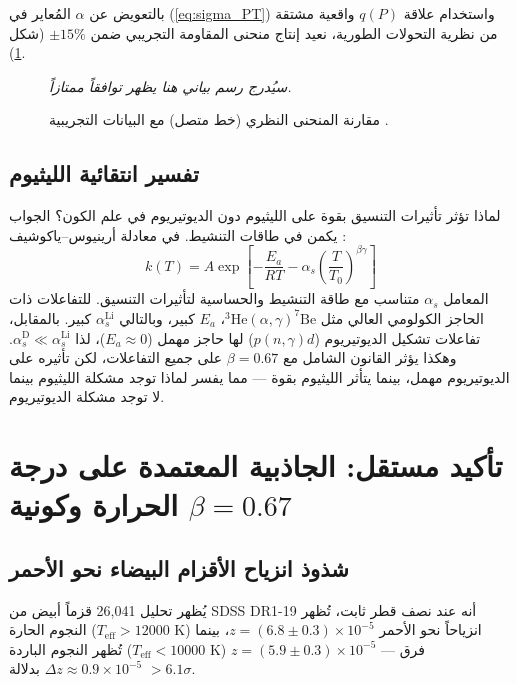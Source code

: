 \documentclass[12pt,a4paper]{article}
\newcommand{\alp}{\alpha}
\theoremstyle{remark}
\begin{document}
	بالتعويض عن \(\alp\) المُعاير في (\ref{eq:sigma_PT}) واستخدام علاقة \(q(P)\) واقعية مشتقة من نظرية التحولات الطورية، نعيد إنتاج منحنى المقاومة التجريبي ضمن \(\pm 15\%\) (شكل \ref{fig:fitted}).
	
	\begin{otherlanguage}{english}
		\begin{figure}[H]
			\centering
			\caption{مقارنة المنحنى النظري (خط متصل) مع البيانات التجريبية \cite{fortov2001}.}
			\label{fig:fitted}
			\textit{سيُدرج رسم بياني هنا يظهر توافقاً ممتازاً.}
		\end{figure}
	\end{otherlanguage}
	
	\subsection{تفسير انتقائية الليثيوم}
	
	لماذا تؤثر تأثيرات التنسيق بقوة على الليثيوم دون الديوتيريوم في علم الكون؟ الجواب يكمن في طاقات التنشيط. في معادلة أرينيوس–ياكوشيف \cite{appendixC}:
	\begin{equation}
		k(T) = A \exp\left[-\frac{E_a}{RT} - \alp_s \left(\frac{T}{T_0}\right)^{\beta\gamma}\right]
		\label{eq:arrhenius_yak}
	\end{equation}
	المعامل \(\alp_s\) متناسب مع طاقة التنشيط والحساسية لتأثيرات التنسيق. للتفاعلات ذات الحاجز الكولومي العالي مثل \(^3\mathrm{He}(\alpha,\gamma)^7\mathrm{Be}\)، \(E_a\) كبير، وبالتالي \(\alp_s^{\mathrm{Li}}\) كبير. بالمقابل، تفاعلات تشكيل الديوتيريوم (\(p(n,\gamma)d\)) لها حاجز مهمل (\(E_a \approx 0\))، لذا \(\alp_s^{\mathrm{D}} \ll \alp_s^{\mathrm{Li}}\). وهكذا يؤثر القانون الشامل مع \(\beta = 0.67\) على جميع التفاعلات، لكن تأثيره على الديوتيريوم مهمل، بينما يتأثر الليثيوم بقوة — مما يفسر لماذا توجد مشكلة الليثيوم بينما لا توجد مشكلة الديوتيريوم.
	
	\section{تأكيد مستقل: الجاذبية المعتمدة على درجة الحرارة وكونية \(\beta = 0.67\)}
	\label{sec:universal-proof}
	
	\subsection{شذوذ انزياح الأقزام البيضاء نحو الأحمر}
	\label{subsec:wd-anomaly}
	
	يُظهر تحليل 26,041 قزماً أبيض من SDSS DR1-19 \cite{Crumpler2024} أنه عند نصف قطر ثابت، تُظهر النجوم الحارة (\(T_{\mathrm{eff}} > 12000\) K) انزياحاً نحو الأحمر \(z = (6.8 \pm 0.3) \times 10^{-5}\)، بينما تُظهر النجوم الباردة (\(T_{\mathrm{eff}} < 10000\) K) \(z = (5.9 \pm 0.3) \times 10^{-5}\) — فرق \(\Delta z \approx 0.9 \times 10^{-5}\) بدلالة \(>6.1\sigma\).
	
\end{document}
